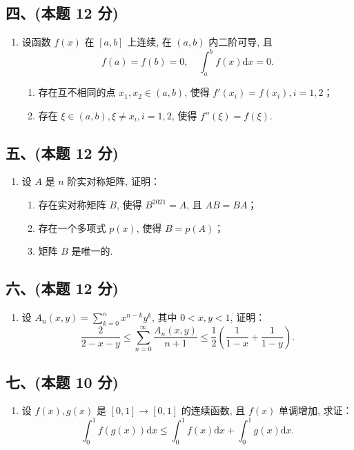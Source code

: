 \subsection*{四、(本题 12 分)}
\begin{enumerate}[start=8]
    \item 设函数 $f(x)$ 在 $[a, b]$ 上连续, 在 $(a, b)$ 内二阶可导, 且
          \[
              f(a) = f(b) = 0, \quad \int_{a}^{b} f(x) \mathrm{d}x = 0.
          \]
          \begin{enumerate}
              \item[(1)] 存在互不相同的点 $x_1, x_2 \in (a, b)$, 使得 $f'(x_i) = f(x_i), i = 1, 2$；
              \item[(2)] 存在 $\xi \in (a, b), \xi \neq x_i, i = 1, 2$, 使得 $f''(\xi) = f(\xi)$.
          \end{enumerate}
\end{enumerate}

\subsection*{五、(本题 12 分)}
\begin{enumerate}[start=9]
    \item 设 $A$ 是 $n$ 阶实对称矩阵, 证明：
          \begin{enumerate}
              \item[(1)] 存在实对称矩阵 $B$, 使得 $B^{2021} = A$, 且 $AB = BA$；
              \item[(2)] 存在一个多项式 $p(x)$, 使得 $B = p(A)$；
              \item[(3)] 矩阵 $B$ 是唯一的.
          \end{enumerate}
\end{enumerate}

\subsection*{六、(本题 12 分)}
\begin{enumerate}[start=10]
    \item 设 $A_n(x, y) = \displaystyle\sum_{k=0}^{n} x^{n-k} y^k$, 其中 $0 < x, y < 1$, 证明：
          \[
              \frac{2}{2 - x - y} \leqslant \sum_{n=0}^{\infty} \frac{A_n(x, y)}{n+1} \leqslant \frac{1}{2} \left( \frac{1}{1 - x} + \frac{1}{1 - y} \right).
          \]
\end{enumerate}

\subsection*{七、(本题 10 分)}
\begin{enumerate}[start=11]
    \item 设 $f(x), g(x)$ 是 $[0, 1] \rightarrow [0, 1]$ 的连续函数, 且 $f(x)$ 单调增加, 求证：
          \[
              \int_{0}^{1} f(g(x)) \mathrm{d}x \leqslant \int_{0}^{1} f(x) \mathrm{d}x + \int_{0}^{1} g(x) \mathrm{d}x.
          \]
\end{enumerate}


